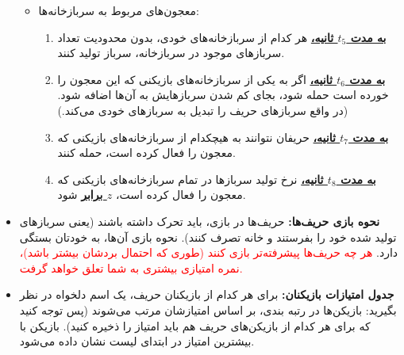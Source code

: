 \documentclass[]{article}
\begin{document}
\begin{itemize}
{\begin{itemize}
{\begin{itemize}
{\begin{enumerate}
{            شود.
            }
        \end{enumerate}
        }
        \item{
        معجون‌های مربوط به سربازخانه‌ها:
        \begin{enumerate}
            \item{
            \textbf{\underline{به مدت $t_5$ ثانیه،}}
            هر کدام از سربازخانه‌های خودی، بدون محدودیت تعداد سربازهای موجود در سربازخانه، سرباز تولید کنند.
            }
            \item{
            \textbf{\underline{به مدت $t_6$ ثانیه،}}
            اگر به یکی از سربازخانه‌های بازیکنی که این معجون را خورده است حمله شود، بجای کم شدن سربازهایش به آن‌ها اضافه شود. (در واقع سربازهای حریف را تبدیل به سرباز‌های خودی می‌کند.)
            }
            \item{
            \textbf{\underline{به مدت $t_7$ ثانیه،}}
            حریفان نتوانند به هیچکدام از سربازخانه‌های بازیکنی که معجون را فعال کرده است، حمله کنند.
            }
            \item{
            \textbf{\underline{به مدت $t_8$ ثانیه،}}
            نرخ تولید سربازها در تمام سربازخانه‌های بازیکنی که معجون را فعال کرده است،
            \textbf{\underline{$z$ برابر}}
            شود.
            }
        \end{enumerate}
        }
    \end{itemize}
    }
\end{itemize}
}

\item{
\textbf{نحوه بازی حریف‌ها:}
\newline
حریف‌ها در بازی، باید تحرک داشته باشند (یعنی سربازهای تولید شده خود را بفرستند و خانه تصرف کنند). نحوه بازی آن‌ها، به خودتان بستگی دارد.
\newline
\textcolor{red}{هر چه حریف‌ها پیشرفته‌تر بازی کنند (طوری که احتمال بردشان بیشتر باشد)، نمره امتیازی بیشتری به شما تعلق خواهد گرفت.
}
}
\item{
\textbf{جدول امتیازات بازیکنان:}
\newline
برای هر کدام از بازیکنان حریف، یک اسم دلخواه در نظر بگیرید: بازیکن‌ها در رتبه بندی، بر اساس امتیازشان مرتب می‌شوند (پس توجه کنید که برای هر کدام از بازیکن‌های حریف هم باید امتیاز را ذخیره کنید). بازیکن با بیشترین امتیاز در ابتدای لیست نشان داده می‌شود.
}

\end{itemize}

\newpage
\end{document}
